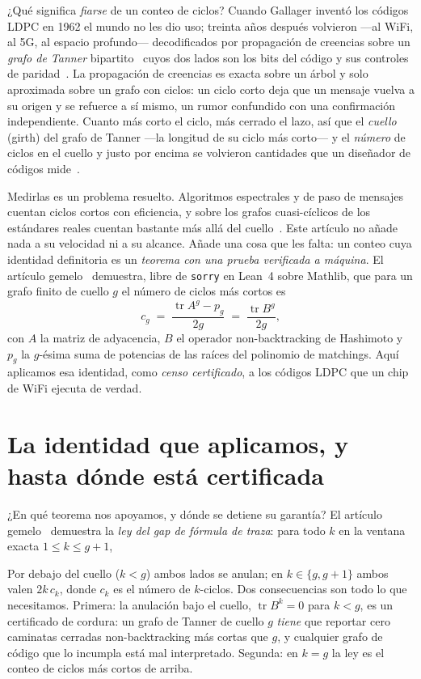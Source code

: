 \documentclass[11pt]{article}
\newcommand{\lean}[1]{\texttt{#1}}
\DeclareMathOperator{\tr}{tr}
\newcommand{\keyeq}[1]{\begin{center}\keybox{$\displaystyle #1$}\end{center}}
\begin{document}
¿Qué significa \emph{fiarse} de un conteo de ciclos? Cuando Gallager inventó los códigos LDPC
en 1962 el mundo no les dio uso; treinta años después volvieron ---al WiFi, al 5G, al espacio
profundo--- decodificados por propagación de creencias sobre un \emph{grafo de Tanner}
bipartito~\cite{Tanner1981} cuyos dos lados son los bits del código y sus controles de
paridad~\cite{Gallager1962,MacKay1999}. La propagación de creencias es exacta sobre un árbol
y solo aproximada sobre un grafo con ciclos: un ciclo corto deja que un mensaje vuelva a su
origen y se refuerce a sí mismo, un rumor confundido con una confirmación independiente.
Cuanto más corto el ciclo, más cerrado el lazo, así que el \emph{cuello} (girth) del grafo de
Tanner ---la longitud de su ciclo más corto--- y el \emph{número} de ciclos en el cuello y
justo por encima se volvieron cantidades que un diseñador de códigos
mide~\cite{Tanner1981,KarimiBanihashemi2013}.

Medirlas es un problema resuelto. Algoritmos espectrales y de paso de mensajes cuentan ciclos
cortos con eficiencia, y sobre los grafos cuasi-cíclicos de los estándares reales cuentan
bastante más allá del cuello~\cite{KarimiBanihashemi2013,BlakeLin2018,Dehghan2018}. Este
artículo no añade nada a su velocidad ni a su alcance. Añade una cosa que les falta: un conteo
cuya identidad definitoria es un \emph{teorema con una prueba verificada a máquina}. El
artículo gemelo~\cite{MarinGapWindow2026} demuestra, libre de \lean{sorry} en Lean~4 sobre
Mathlib, que para un grafo finito de cuello $g$ el número de ciclos más cortos es
\[
c_g \;=\; \frac{\tr A^g - p_g}{2g} \;=\; \frac{\tr B^g}{2g},
\]
con $A$ la matriz de adyacencia, $B$ el operador non-backtracking de Hashimoto y $p_g$ la
$g$-ésima suma de potencias de las raíces del polinomio de matchings. Aquí aplicamos esa
identidad, como \emph{censo certificado}, a los códigos LDPC que un chip de WiFi ejecuta de
verdad.

\section{La identidad que aplicamos, y hasta dónde está certificada}
\label{sec:identity}

¿En qué teorema nos apoyamos, y dónde se detiene su garantía? El artículo
gemelo~\cite{MarinGapWindow2026} demuestra la \emph{ley del gap de fórmula de traza}: para
todo $k$ en la ventana exacta $1 \le k \le g+1$,
\keyeq{\tr A^k \;-\; p_k \;=\; \tr B^k .}
Por debajo del cuello ($k < g$) ambos lados se anulan; en $k \in \{g, g+1\}$ ambos valen
$2k\,c_k$, donde $c_k$ es el número de $k$-ciclos. Dos consecuencias son todo lo que
necesitamos. Primera: la anulación bajo el cuello, $\tr B^k = 0$ para $k < g$, es un
certificado de cordura: un grafo de Tanner de cuello $g$ \emph{tiene} que reportar cero
caminatas cerradas non-backtracking más cortas que $g$, y cualquier grafo de código que lo
incumpla está mal interpretado. Segunda: en $k = g$ la ley es el conteo de ciclos más cortos
de arriba.
\end{document}
